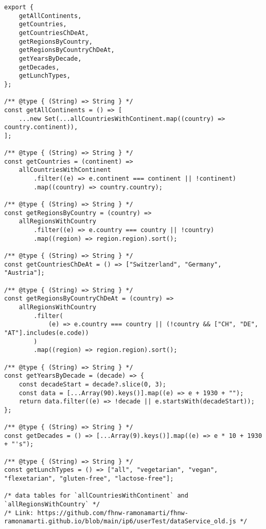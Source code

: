 


\begin{lstlisting}[style = htmlcssjs, caption = dataServiceJs, label = code:dataService.js]
export {
    getAllContinents,
    getCountries,
    getCountriesChDeAt,
    getRegionsByCountry,
    getRegionsByCountryChDeAt,
    getYearsByDecade,
    getDecades,
    getLunchTypes,
};

/** @type { (String) => String } */
const getAllContinents = () => [
    ...new Set(...allCountriesWithContinent.map((country) => country.continent)),
];

/** @type { (String) => String } */
const getCountries = (continent) =>
    allCountriesWithContinent
        .filter((e) => e.continent === continent || !continent)
        .map((country) => country.country);

/** @type { (String) => String } */
const getRegionsByCountry = (country) =>
    allRegionsWithCountry
        .filter((e) => e.country === country || !country)
        .map((region) => region.region).sort();

/** @type { (String) => String } */
const getCountriesChDeAt = () => ["Switzerland", "Germany", "Austria"];

/** @type { (String) => String } */
const getRegionsByCountryChDeAt = (country) =>
    allRegionsWithCountry
        .filter(
            (e) => e.country === country || (!country && ["CH", "DE", "AT"].includes(e.code))
        )
        .map((region) => region.region).sort();

/** @type { (String) => String } */
const getYearsByDecade = (decade) => {
    const decadeStart = decade?.slice(0, 3);
    const data = [...Array(90).keys()].map((e) => e + 1930 + "");
    return data.filter((e) => !decade || e.startsWith(decadeStart));
};

/** @type { (String) => String } */
const getDecades = () => [...Array(9).keys()].map((e) => e * 10 + 1930 + "'s");

/** @type { (String) => String } */
const getLunchTypes = () => ["all", "vegetarian", "vegan", "flexetarian", "gluten-free", "lactose-free"];

/* data tables for `allCountriesWithContinent` and `allRegionsWithCountry` */
/* Link: https://github.com/fhnw-ramonamarti/fhnw-ramonamarti.github.io/blob/main/ip6/userTest/dataService_old.js */
\end{lstlisting}



